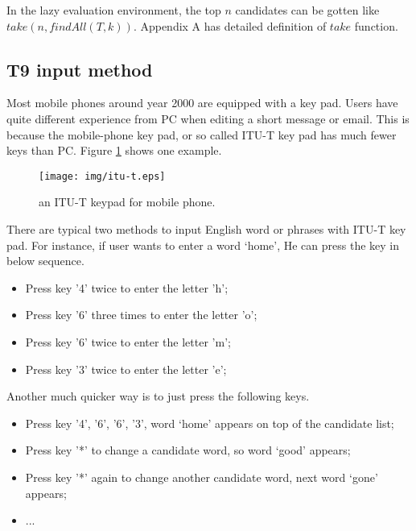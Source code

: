 \documentclass[UTF8]{article}
\begin{document}
In the lazy evaluation environment, the top $n$ candidates can be
gotten like $take(n, findAll(T, k))$. Appendix A has detailed definition
of $take$ function.


\subsection{T9 input method}

Most mobile phones around year 2000 are equipped with a key pad.
Users have quite different experience from PC when editing a short message
or email.
This is because the mobile-phone key pad, or so called ITU-T key pad has much fewer
keys than PC. Figure \ref{fig:itut-keypad} shows one example.

\begin{figure}[htbp]
  \centering
  \texttt{[image: img/itu-t.eps]}
  \caption{an ITU-T keypad for mobile phone.}
  \label{fig:itut-keypad}
\end{figure}

There are typical two methods to input English word or phrases with ITU-T key pad.
For instance, if user wants to enter a word `home', He can press the key
in below sequence.

\begin{itemize}
\item Press key '4' twice to enter the letter 'h';
\item Press key '6' three times to enter the letter 'o';
\item Press key '6' twice to enter the letter 'm';
\item Press key '3' twice to enter the letter 'e';
\end{itemize}

Another much quicker way is to just press the following keys.

\begin{itemize}
\item Press key '4', '6', '6', '3', word `home' appears on top of the candidate list;
\item Press key '*' to change a candidate word, so word `good' appears;
\item Press key '*' again to change another candidate word, next word `gone' appears;
\item ...
\end{itemize}
\end{document}
